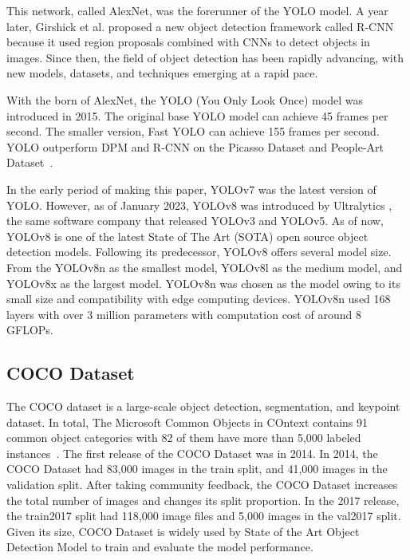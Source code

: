 \documentclass[conference]{IEEEtran}
\begin{document}
This network, called AlexNet, was the forerunner of the YOLO model.
A year later, Girshick et al. \@ proposed a new object detection framework called R-CNN~\cite{b3} because it used region proposals combined with CNNs to detect objects in images.
Since then, the field of object detection has been rapidly advancing, with new models, datasets, and techniques emerging at a rapid pace. 

With the born of AlexNet, the YOLO (You Only Look Once) model was introduced in 2015. The original base YOLO model can achieve 45 frames per second.
The smaller version, Fast YOLO can achieve 155 frames per second.
YOLO outperform DPM and R-CNN on the Picasso Dataset and People-Art Dataset~\cite{You Only Look Once}.

In the early period of making this paper, YOLOv7 was the latest version of YOLO\@.
However, as of January 2023, YOLOv8 was introduced by Ultralytics , the same software company that released YOLOv3 and YOLOv5. 
As of now, YOLOv8 is one of the latest State of The Art (SOTA) open source object detection models. Following its predecessor, YOLOv8 offers several model size.
From the YOLOv8n as the smallest model, YOLOv8l as the medium model, and YOLOv8x as the largest model.
YOLOv8n was chosen as the model owing to its small size and compatibility with edge computing devices.
YOLOv8n used 168 layers with over 3 million parameters with computation cost of around 8 GFLOPs.
\subsection{COCO Dataset}\label{AA}
The COCO dataset is a large-scale object detection, segmentation, and keypoint dataset.
In total, The Microsoft Common Objects in COntext contains 91 common object categories with 82 of them have more than 5,000 labeled instances~\cite{COCO Dataset}.
The first release of the COCO Dataset was in 2014. In 2014, the COCO Dataset had 83,000 images in the  train split, and 41,000 images in the validation split.
After taking community feedback, the COCO Dataset increases the total number of images and changes its split proportion. In the 2017 release, the train2017 split had 118,000 image files and 5,000 images in the val2017 split.
Given its size, COCO Dataset is widely used by State of the Art Object Detection Model to train and evaluate the model performance.
\end{document}
